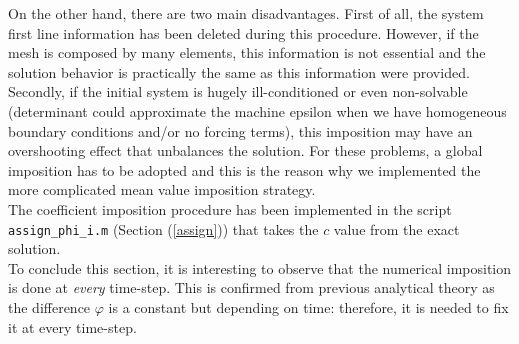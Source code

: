 \documentclass[a4paper,11pt]{article}
\begin{document}
\noindent On the other hand, there are two main disadvantages. First of all, the system first line information has been deleted during this procedure. However, if the mesh is composed by many elements, this information is not essential and the solution behavior is practically the same as this information were provided. \\
Secondly, if the initial system is hugely ill-conditioned or even non-solvable (determinant could approximate the machine epsilon when we have homogeneous boundary conditions and/or no forcing terms), this imposition may have an overshooting effect that unbalances the solution. For these problems, a global imposition has to be adopted and this is the reason why we implemented the more complicated mean value imposition strategy.\\

\noindent The coefficient imposition procedure has been implemented in the script \texttt{assign\_phi\_i.m} (Section (\ref{assign})) that takes the $c$ value from the exact solution.\\
\noindent To conclude this section, it is interesting to observe that the numerical imposition is done at \emph{every} time-step. This is confirmed from previous analytical theory as the difference $\varphi$ is a constant but depending on time: therefore, it is needed to fix it at every time-step.
\end{document}
